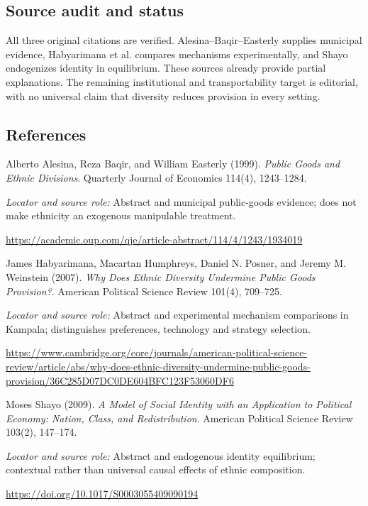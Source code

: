 \documentclass[11pt,a4paper]{article}
\begin{document}
\subsection*{Source audit and status}
All three original citations are verified. Alesina--Baqir--Easterly supplies municipal evidence, Habyarimana et al. compares mechanisms experimentally, and Shayo endogenizes identity in equilibrium. These sources already provide partial explanations. The remaining institutional and transportability target is editorial, with no universal claim that diversity reduces provision in every setting.
\subsection*{References}
{\footnotesize\raggedright
\begin{enumerate}[label={\textbf{[S\arabic*]}},leftmargin=3em]
\item Alberto Alesina, Reza Baqir, and William Easterly (1999). \emph{Public Goods and Ethnic Divisions}. Quarterly Journal of Economics 114(4), 1243--1284.\par
\textit{Locator and source role:} Abstract and municipal public-goods evidence; does not make ethnicity an exogenous manipulable treatment.\par
\url{https://academic.oup.com/qje/article-abstract/114/4/1243/1934019}
\item James Habyarimana, Macartan Humphreys, Daniel N. Posner, and Jeremy M. Weinstein (2007). \emph{Why Does Ethnic Diversity Undermine Public Goods Provision?}. American Political Science Review 101(4), 709--725.\par
\textit{Locator and source role:} Abstract and experimental mechanism comparisons in Kampala; distinguishes preferences, technology and strategy selection.\par
\url{https://www.cambridge.org/core/journals/american-political-science-review/article/abs/why-does-ethnic-diversity-undermine-public-goods-provision/36C285D07DC0DE604BFC123F53060DF6}
\item Moses Shayo (2009). \emph{A Model of Social Identity with an Application to Political Economy: Nation, Class, and Redistribution}. American Political Science Review 103(2), 147--174.\par
\textit{Locator and source role:} Abstract and endogenous identity equilibrium; contextual rather than universal causal effects of ethnic composition.\par
\url{https://doi.org/10.1017/S0003055409090194}
\end{enumerate}
}
\end{document}
